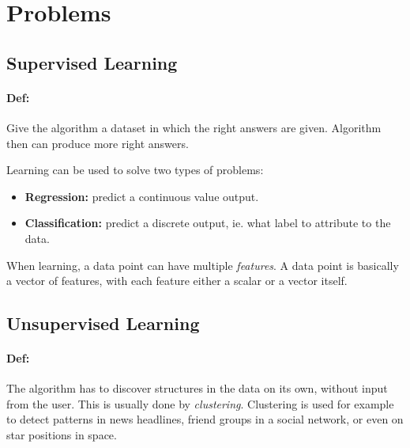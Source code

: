 \documentclass[11pt,a4paper]{article}
\begin{document}
\section{Problems}
\subsection{Supervised Learning}
\paragraph*{Def:} Give the algorithm a dataset in which the right answers are given. Algorithm then can produce more right answers. 

Learning can be used to solve two types of problems:
\begin{itemize}
\item \textbf{Regression:} predict a continuous value output.
\item \textbf{Classification:} predict a discrete output, ie. what label to attribute to the data.
\end{itemize}

When learning, a data point can have multiple \emph{features}. A data point is basically a vector of features, with each feature either a scalar or a vector itself.

\subsection{Unsupervised Learning}
\paragraph*{Def:} The algorithm has to discover structures in the data on its own, without input from the user. This is usually done by \emph{clustering}. Clustering is used for example to detect patterns in news headlines, friend groups in a social network, or even on star positions in space.
\end{document}

